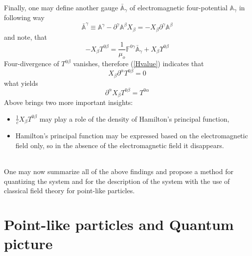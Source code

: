 \documentclass[aps,prx,preprint,groupedaddress,showkeys]{revtex4-2}
\begin{document}
~\\
Finally, one may define another gauge $\bar{\mathbb{A}}_{\gamma}$ of electromagnetic four-potential $\mathbb{A}_{\gamma}$ in following way
\begin{equation} \label{HQ6}
\bar{\mathbb{A}}^{\gamma} \equiv  \mathbb{A}^{\gamma} - \partial^{\gamma} \mathbb{A}^{\beta}X_{\beta} = - X_{\beta} \partial^{\gamma} \mathbb{A}^{\beta}
\end{equation}
and note, that
\begin{equation} \label{HQ7}
- X_{\beta} T^{0 \beta} =  \frac{1}{\mu_o} \mathbb{F}^{0 \gamma} \bar{\mathbb{A}}_{\gamma} + X_{\beta} \Upsilon^{0 \beta}
\end{equation}
Four-divergence of $T^{0 \beta}$ vanishes, therefore (\ref{Hvalue}) indicates that
\begin{equation} \label{HQ8}
X_{\beta} \partial^{\alpha} T^{0 \beta} = 0
\end{equation}
what yields
\begin{equation} \label{HQ9}
\partial^{\alpha} X_{\beta} T^{0 \beta} =  T^{0 \alpha}
\end{equation}
Above brings two more important insights: 
\begin{itemize}
  \item $\frac{1}{c}X_{\beta} T^{0 \beta}$ may play a role of the density of Hamilton's principal function,
  \item Hamilton's principal function may be expressed based on the electromagnetic field only, so in the absence of the electromagnetic field it disappears.
\end{itemize}
~\\
One may now summarize all of the above findings and propose a method for quantizing the system and for the description of the system with the use of classical field theory for point-like particles. 

\section{Point-like particles and Quantum picture} \label{Quantas}
\end{document}
